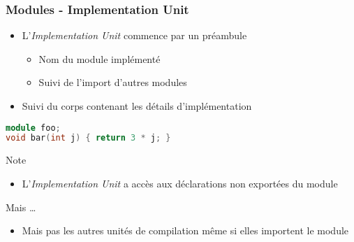 \documentclass[C++.tex]{subfiles}
\begin{document}
\begin{frame}[fragile]
	\frametitle{Modules - Implementation Unit}
	\begin{itemize}
		\item L'\textit{Implementation Unit} commence par un préambule
		\begin{itemize}
			\item Nom du module implémenté
			\item Suivi de l'import d'autres modules
		\end{itemize}

		\item Suivi du corps contenant les détails d'implémentation
	\end{itemize}

	\begin{lstlisting}[language=C++]
module foo;
void bar(int j) { return 3 * j; }\end{lstlisting}

	\begin{block}{Note}
		\begin{itemize}
			\item L'\textit{Implementation Unit} a accès aux déclarations non exportées du module
		\end{itemize}

	\end{block}
	
	\pause
	
	\begin{alertblock}{Mais \ldots}
		\begin{itemize}
			\item Mais pas les autres unités de compilation même si elles importent le module
		\end{itemize}
	\end{alertblock}
\end{frame}
\end{document}
